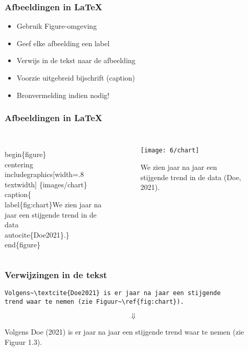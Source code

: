 \documentclass[aspectratio=169]{beamer}
\begin{document}
\begin{frame}
  \frametitle{Afbeeldingen in {\LaTeX}}

  \begin{itemize}
    \item Gebruik Figure-omgeving
    \item Geef elke afbeelding een label
    \item Verwijs in de tekst naar de afbeelding
    \item Voorzie uitgebreid bijschrift (caption)
    \item Bronvermelding indien nodig!
  \end{itemize}

\end{frame}

\begin{frame}
  \frametitle{Afbeeldingen in {\LaTeX}}

  \begin{columns}[c]

\begin{semiverbatim}
\small
\alert<1>{\\begin\{figure\}}
  \alert<2>{\\centering}
  \alert<3>{\\includegraphics[width=.8\\textwidth]
    \{images/chart\}}
  \alert<4>{\\caption\{\alert<5>{\\label\{fig:chart\}}We zien jaar
    na jaar een stijgende trend in
    de data \alert<6>{\\autocite\{Doe2021\}}.\}}
\alert<1>{\\end\{figure\}}
\end{semiverbatim}

    \begin{figure}
      \centering
      \texttt{[image: 6/chart]}
      \caption{\label{fig:chart}We zien jaar na jaar een stijgende trend in de data (Doe, 2021).}
    \end{figure}

  \end{columns}

\end{frame}

\begin{frame}[fragile]
  \frametitle{Verwijzingen in de tekst}

  \begin{verbatim}
Volgens~\textcite{Doe2021} is er jaar na jaar een stijgende
trend waar te nemen (zie Figuur~\ref{fig:chart}).
\end{verbatim}

  \[\Downarrow\]

  \bigskip

  Volgens Doe (2021) is er jaar na jaar een stijgende trend waar te nemen (zie Figuur 1.3).

\end{frame}
\end{document}
